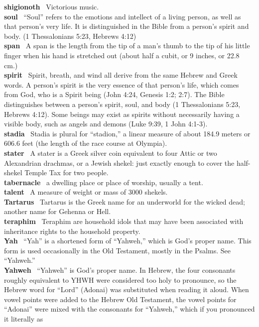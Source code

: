 \textbf{shigionoth}~ Victorious music.\\
\textbf{soul}~ ``Soul'' refers to the emotions and intellect of a living
person, as well as that person's very life. It is distinguished in the
Bible from a person's spirit and body. (1 Thessalonians 5:23, Hebrews
4:12)\\
\textbf{span}~ A span is the length from the tip of a man's thumb to the
tip of his little finger when his hand is stretched out (about half a
cubit, or 9 inches, or 22.8 cm.)\\
\textbf{spirit}~ Spirit, breath, and wind all derive from the same
Hebrew and Greek words. A person's spirit is the very essence of that
person's life, which comes from God, who is a Spirit being (John 4:24,
Genesis 1:2; 2:7). The Bible distinguishes between a person's spirit,
soul, and body (1 Thessalonians 5:23, Hebrews 4:12). Some beings may
exist as spirits without necessarily having a visible body, such as
angels and demons (Luke 9:39, 1 John 4:1-3).\\
\textbf{stadia}~ Stadia is plural for ``stadion,'' a linear measure of
about 184.9 meters or 606.6 feet (the length of the race course at
Olympia).\\
\textbf{stater}~ A stater is a Greek silver coin equivalent to four
Attic or two Alexandrian drachmas, or a Jewish shekel: just exactly
enough to cover the half-shekel Temple Tax for two people.\\
\textbf{tabernacle}~ a dwelling place or place of worship, usually a
tent.\\
\textbf{talent}~ A measure of weight or mass of 3000 shekels.\\
\textbf{Tartarus}~ Tartarus is the Greek name for an underworld for the
wicked dead; another name for Gehenna or Hell.\\
\textbf{teraphim}~ Teraphim are household idols that may have been
associated with inheritance rights to the household property.\\
\textbf{Yah}~ ``Yah'' is a shortened form of ``Yahweh,'' which is God's
proper name. This form is used occasionally in the Old Testament, mostly
in the Psalms. See ``Yahweh.''\\
\textbf{Yahweh}~ ``Yahweh'' is God's proper name. In Hebrew, the four
consonants roughly equivalent to YHWH were considered too holy to
pronounce, so the Hebrew word for ``Lord'' (Adonai) was substituted when
reading it aloud. When vowel points were added to the Hebrew Old
Testament, the vowel points for ``Adonai'' were mixed with the
consonants for ``Yahweh,'' which if you pronounced it literally as
